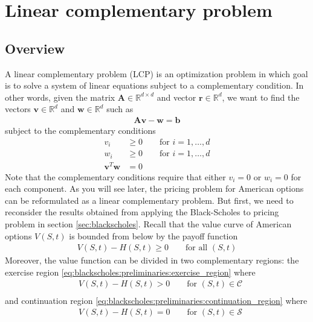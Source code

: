\section{Linear complementary problem}
\subsection{Overview}
A linear complementary problem (LCP) is an optimization problem in which goal is to solve a system of linear equations subject to a complementary condition. In other words, given the matrix $\mathbf{A}\in\mathbb{R}^{d \times d}$ and vector $\mathbf{r}\in\mathbb{R}^{d}$, we want to find the vectors $\mathbf{v}\in\mathbb{R}^{d}$ and $\mathbf{w}\in\mathbb{R}^{d}$ such as
\begin{align*}
  \mathbf{A}\mathbf{v} - \mathbf{w} = \mathbf{b}
\end{align*}
subject to the complementary conditions 
\begin{align*}
  v_i &\ge 0 \qquad \text{for $i = 1,\dots,d$} \\
  w_i &\ge 0 \qquad \text{for $i = 1,\dots,d$} \\
  \mathbf{v}^{T}\mathbf{w} &= 0
\end{align*}
Note that the complementary conditions require that either $v_i=0$ or $w_i=0$ for each component. As you will see later, the pricing problem for American options can be reformulated as a linear complementary problem. But first, we need to reconsider the results obtained from applying the Black-Scholes to pricing problem in section \ref{sec:blackscholes}. Recall that the value curve of American options $V(S,t)$ is bounded from below by the payoff function 
\begin{align*}
  V(S, t) - H(S, t) \ge 0 \qquad \text{for all $(S,t)$}
\end{align*}
Moreover, the value function can be divided in two complementary regions: the exercise region \eqref{eq:blackscholes:preliminaries:exercise_region} where  
\begin{align}
  \label{eq:lcp:overview:value_in_continuation_region}
  &V(S, t) - H(S, t) > 0 \qquad \text{for $(S,t) \in \mathcal{C}$} \\ 
\end{align}
and continuation region \eqref{eq:blackscholes:preliminaries:continuation_region} where 
\begin{align}
  \label{eq:lcp:overview:value_in_exercise_region}
  &V(S, t) - H(S, t) = 0 \qquad \text{for $(S,t) \in \mathcal{S}$}
\end{align}
